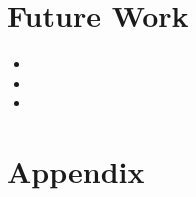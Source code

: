 \documentclass{article}
\begin{document}
\section{Future Work}

\begin{itemize}
\item 
\item
\item 
\end{itemize}


\section{Appendix}

%
%
\end{document}
